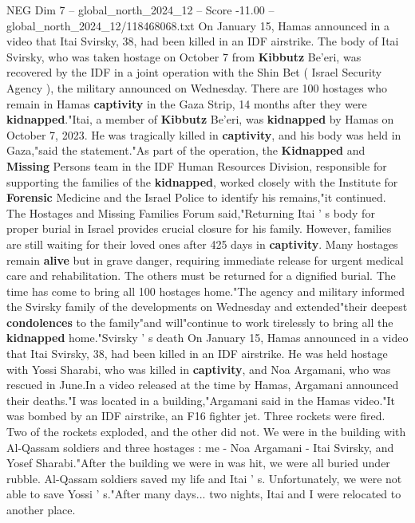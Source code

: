 \begin{textsample}{NEG Dim 7 – global\_north\_2024\_12 – Score -11.00 – global\_north\_2024\_12/118468068.txt}  \label{ex:f7_neg_152}
On January 15, Hamas announced in a video that Itai Svirsky, 38, had been killed in an IDF airstrike.
The body of Itai Svirsky, who was taken hostage on October 7 from \textbf{Kibbutz} Be'eri, was recovered by the IDF in a joint operation with the Shin Bet ( Israel Security Agency ), the military announced on Wednesday.
There are 100 hostages who remain in Hamas \textbf{captivity} in the Gaza Strip, 14 months after they were \textbf{kidnapped}."Itai, a member of \textbf{Kibbutz} Be'eri, was \textbf{kidnapped} by Hamas on October 7, 2023.
He was tragically killed in \textbf{captivity}, and his body was held in Gaza,"said the statement."As part of the operation, the \textbf{Kidnapped} and \textbf{Missing} Persons team in the IDF Human Resources Division, responsible for supporting the families of the \textbf{kidnapped}, worked closely with the Institute for \textbf{Forensic} Medicine and the Israel Police to identify his remains,"it continued.
The Hostages and Missing Families Forum said,"Returning Itai ' s body for proper burial in Israel provides crucial closure for his family.
However, families are still waiting for their loved ones after 425 days in \textbf{captivity}.
Many hostages remain \textbf{alive} but in grave danger, requiring immediate release for urgent medical care and rehabilitation.
The others must be returned for a dignified burial.
The time has come to bring all 100 hostages home."The agency and military informed the Svirsky family of the developments on Wednesday and extended"their deepest \textbf{condolences} to the family"and will"continue to work tirelessly to bring all the \textbf{kidnapped} home."Svirsky ' s death On January 15, Hamas announced in a video that Itai Svirsky, 38, had been killed in an IDF airstrike.
He was held hostage with Yossi Sharabi, who was killed in \textbf{captivity}, and Noa Argamani, who was rescued in June.In a video released at the time by Hamas, Argamani announced their deaths."I was located in a building,"Argamani said in the Hamas video."It was bombed by an IDF airstrike, an F16 fighter jet.
Three rockets were fired.
Two of the rockets exploded, and the other did not.
We were in the building with Al-Qassam soldiers and three hostages : me - Noa Argamani - Itai Svirsky, and Yosef Sharabi."After the building we were in was hit, we were all buried under rubble.
Al-Qassam soldiers saved my life and Itai ' s.
Unfortunately, we were not able to save Yossi ' s."After many days... two nights, Itai and I were relocated to another place.

\end{textsample}
